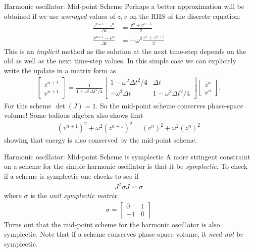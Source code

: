 \documentclass[pdf]{beamer}
\theoremstyle{definition}
\begin{document}
\begin{frame}{Harmonic oscillator: Mid-point Scheme}
  \small%
  Perhaps a better approximation will be obtained if we use
  \emph{averaged} values of $z,v$ on the RHS of the discrete
  equation:
  \begin{align*}
    \frac{z^{n+1}-z^n}{\Delta t} &= \frac{v^n +v^{n+1}}{2} \\
    \frac{v^{n+1}-v^n}{\Delta t} &= -\omega^2\frac{z^n + z^{n+1}}{2}
  \end{align*}
  This is an \emph{implicit} method as the solution at the next
  time-step depends on the old as well as the next time-step
  values. In this simple case we can explicitly write the update in a
  matrix form as
  \begin{align*}
    \left[
    \begin{matrix}
      z^{n+1} \\
      v^{n+1}
    \end{matrix}
      \right]
      =
      \frac{1}{1+\omega^2\Delta t^2/4}
    \left[
      \begin{matrix}
        1-\omega^2\Delta t^2/4  & \Delta t \\
        -\omega^2 \Delta t & 1-\omega^2\Delta t^2/4
      \end{matrix}
    \right]
    \left[
    \begin{matrix}
      z^{n} \\
      v^{n}
    \end{matrix}
    \right].                        
  \end{align*}
  For this scheme $\det(J)=1$. So the mid-point scheme conserves
  phase-space volume! Some tedious algebra also shows that
  \begin{align*}
    (v^{n+1})^2 + \omega^2 (z^{n+1})^2 = (v^{n})^2 + \omega^2 (z^{n})^2
  \end{align*}
  showing that energy is also conserved by the mid-point scheme.
\end{frame}

\begin{frame}{Harmonic oscillator: Mid-point Scheme is symplectic}
  A more stringent constraint on a scheme for the simple harmonic
  oscillator is that it be \emph{symplectic}. To check if a scheme is
  symplectic one checks to see if
  \begin{align*}
    J^T\sigma J = \sigma
  \end{align*}
  where $\sigma$ is the \emph{unit symplectic matrix}
  \begin{align*}
    \sigma
    =
    \left[
      \begin{matrix}
        0 & 1 \\
        -1 & 0
      \end{matrix}
    \right]    
  \end{align*}
  Turns out that the mid-point scheme for the harmonic oscillator is
  also symplectic. Note that if a scheme conserves phase-space
  volume, it \emph{need not} be symplectic.
\end{frame}  
\end{document}
